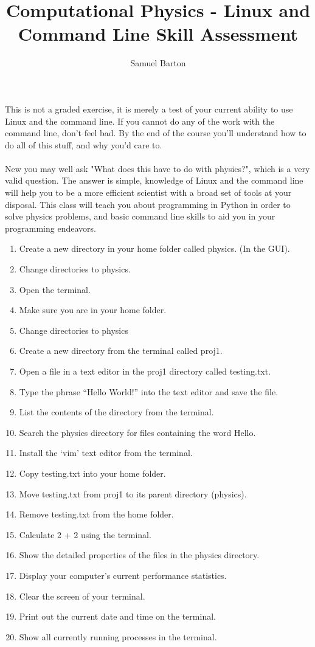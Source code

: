 \documentclass{article}
\title{Computational Physics - Linux and Command Line Skill Assessment}
\author {Samuel Barton}
\begin{document}
	
	\maketitle
	
	This is not a graded exercise, it is merely a test of your current ability to use Linux and the command line. If you cannot do any of the work with the command line, don't feel bad. By the end of the course you'll understand how to do all of this stuff, and why you'd care to.
\\
\\
	New you may well ask "What does this have to do with physics?", which is a very valid question. The answer is simple, knowledge of Linux and the command line will help you to be a more efficient scientist with a broad set of tools at your disposal. This class will teach you about programming in Python in order to solve physics problems, and basic command line skills to aid you in your programming endeavors.
	
	\newpage
	
	\begin{enumerate}
		\item Create a new directory in your home folder called physics. (In the GUI).
		\item Change directories to physics. 
		\item Open the terminal. 
		\item Make sure you are in your home folder.
		\item Change directories to physics
		\item Create a new directory from the terminal called proj1.
		\item Open a file in a text editor in the proj1 directory called testing.txt.
		\item Type the phrase “Hello World!” into the text editor and save the file.
		\item List the contents of the directory from the terminal.
		\item Search the physics directory for files containing the word Hello.
		\item Install the ‘vim’ text editor from the terminal.
		\item Copy testing.txt into your home folder.
		\item Move testing.txt from proj1 to its parent directory (physics).
		\item Remove testing.txt from the home folder.
		\item Calculate 2 + 2 using the terminal.
		\item Show the detailed properties of the files in the physics directory.
		\item Display your computer’s current performance statistics.
		\item Clear the screen of your terminal.
		\item Print out the current date and time on the terminal.
		\item Show all currently running processes in the terminal.
	\end{enumerate}
\end{document}
